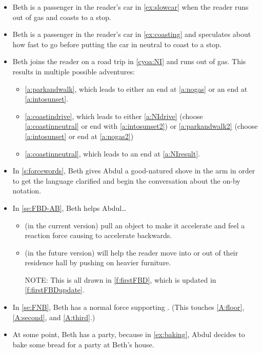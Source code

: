 \documentclass[11pt,letter,openany,makeidx]{book}
\newcommand{\studentA}{Abdul}       \newcommand{\massA}{\mbox{$85.0\unit{kg}$}}
\newcommand{\studentB}{Beth}        \newcommand{\massB}{\mbox{$75.0\unit{kg}$}}
\begin{document}
\begin{itemize}
\item \studentB{} is a passenger in the reader's car in \autoref{ex:slowcar} when the reader runs out of gas and coasts to a stop.
\item \studentB{} is a passenger in the reader's car in \autoref{ex:coasting} and speculates about how fast to go before putting the car in neutral to coast to a stop.
\item \studentB{} joins the reader on a road trip in \autoref{cyoa:NI} and runs out of gas.  This results in multiple possible adventures:
\begin{itemize}
    \item \ref{a:parkandwalk}, which leads to either an end at \ref{a:nogas} or an end at \ref{a:intosunset}.
    \item \ref{a:coastindrive}, which leads to either \ref{a:NIdrive} (choose \ref{a:coastinneutral} or end with \ref{a:intosunset2}) or \ref{a:parkandwalk2} (choose \ref{a:intosunset} or end at \ref{a:nogas2})
    \item \ref{a:coastinneutral}, which leads to an end at \ref{a:NIresult}.
\end{itemize}
\item In \autoref{s:forcewords}, \studentB{} gives \studentA{} a good-natured shove in the arm in order to get the language clarified and begin the conversation about the on-by notation.
\item In \autoref{se:FBD-AB}, \studentB{} helps \studentA{}\ldots
    \begin{itemize}
    \item (in the current version) pull an object to make it accelerate and feel a reaction force causing \himB{} to accelerate backwards.
    \item (in the future version) will help the reader move into or out of their residence hall by pushing on heavier furniture.
    \item[NOTE:] This is all drawn in \autoref{f:firstFBD}, which is updated in \autoref{f:firstFBDupdate}.
    \end{itemize}
\item In \ref{se:FNB}, \studentB{} has a normal force supporting \himB.  (This touches \ref{A:floor}, \ref{A:second}, and \ref{A:third}.)
\item At some point, \studentB{} has a party, because in \autoref{ex:baking}, \studentA{} decides to bake some bread for a party at \studentB's house.
\end{itemize}
\end{document}
